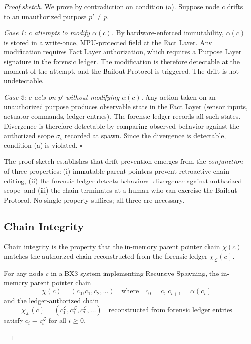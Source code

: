 \begin{proof}[Proof sketch]
We prove by contradiction on condition (a). Suppose node $c$ drifts to an unauthorized purpose $p' \neq p$.

\textit{Case 1: $c$ attempts to modify $\alpha(c)$.} By hardware-enforced immutability, $\alpha(c)$ is stored in a write-once, MPU-protected field at the Fact Layer. Any modification requires Fact Layer authorization, which requires a Purpose Layer signature in the forensic ledger. The modification is therefore detectable at the moment of the attempt, and the Bailout Protocol is triggered. The drift is not undetectable.

\textit{Case 2: $c$ acts on $p'$ without modifying $\alpha(c)$.} Any action taken on an unauthorized purpose produces observable state in the Fact Layer (sensor inputs, actuator commands, ledger entries). The forensic ledger records all such states. Divergence is therefore detectable by comparing observed behavior against the authorized scope $\sigma_c$ recorded at spawn. Since the divergence is detectable, condition (a) is violated. $\square$
\endproof

The proof sketch establishes that drift prevention emerges from the \textit{conjunction} of three properties: (i) immutable parent pointers prevent retroactive chain-editing, (ii) the forensic ledger detects behavioral divergence against authorized scope, and (iii) the chain terminates at a human who can exercise the Bailout Protocol. No single property suffices; all three are necessary.

\subsection{Chain Integrity}
\label{sec:chain-integrity}

Chain integrity is the property that the in-memory parent pointer chain $\chi(c)$ matches the authorized chain reconstructed from the forensic ledger $\chi_{\mathcal{L}}(c)$.

\begin{thrm}
\label{thrm:chain-integrity}
For any node $c$ in a BX3 system implementing Recursive Spawning, the in-memory parent pointer chain
\begin{equation}
\chi(c) = (c_0, c_1, c_2, \ldots)
\quad\text{where}\quad
c_0 = c,\ c_{i+1} = \alpha(c_i)
\end{equation}
and the ledger-authorized chain
\begin{equation}
\chi_{\mathcal{L}}(c) = (c_0^{\mathcal{L}}, c_1^{\mathcal{L}}, c_2^{\mathcal{L}}, \ldots)
\quad\text{reconstructed from forensic ledger entries}
\end{equation}
satisfy $c_i = c_i^{\mathcal{L}}$ for all $i \geq 0$.
\end{thrm}


\end{proof}
